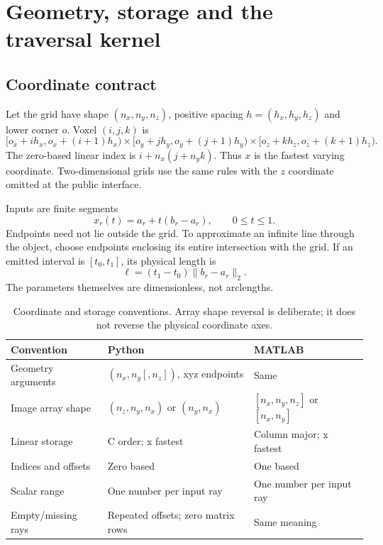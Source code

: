 \documentclass[11pt,a4paper]{article}
\begin{document}
\section{Geometry, storage and the traversal kernel}
\label{sec:geometry}
\subsection{Coordinate contract}
Let the grid have shape $(n_x,n_y,n_z)$, positive spacing
$h=(h_x,h_y,h_z)$ and lower corner $o$. Voxel $(i,j,k)$ is
\[
 [o_x+ih_x,o_x+(i+1)h_x)\times
 [o_y+jh_y,o_y+(j+1)h_y)\times
 [o_z+kh_z,o_z+(k+1)h_z).
\]
The zero-based linear index is $i+n_x(j+n_y k)$. Thus $x$ is the fastest
varying coordinate. Two-dimensional grids use the same rules with the
$z$ coordinate omitted at the public interface.

Inputs are finite segments
\begin{equation}
 x_r(t)=a_r+t(b_r-a_r),\qquad 0\leq t\leq1.
 \label{eq:segment}
\end{equation}
Endpoints need not lie outside the grid. To approximate an infinite line
through the object, choose endpoints enclosing its entire intersection
with the grid. If an emitted interval is $[t_0,t_1]$, its physical length is
\begin{equation}
 \ell=(t_1-t_0)\lVert b_r-a_r\rVert_2.
 \label{eq:length}
\end{equation}
The parameters themselves are dimensionless, not arclengths.

\begin{table}[htbp]
\centering\small
\begin{tabularx}{\linewidth}{@{}lYY@{}}
\toprule
Convention & Python & MATLAB \\
\midrule
Geometry arguments & $(n_x,n_y[,n_z])$, xyz endpoints & Same \\
Image array shape & $(n_z,n_y,n_x)$ or $(n_y,n_x)$ & $[n_x,n_y,n_z]$ or $[n_x,n_y]$ \\
Linear storage & C order; x fastest & Column major; x fastest \\
Indices and offsets & Zero based & One based \\
Scalar range & One number per input ray & One number per input ray \\
Empty/missing rays & Repeated offsets; zero matrix rows & Same meaning \\
\bottomrule
\end{tabularx}
\caption{Coordinate and storage conventions. Array shape reversal is deliberate;
it does not reverse the physical coordinate axes.}
\end{table}
\end{document}
